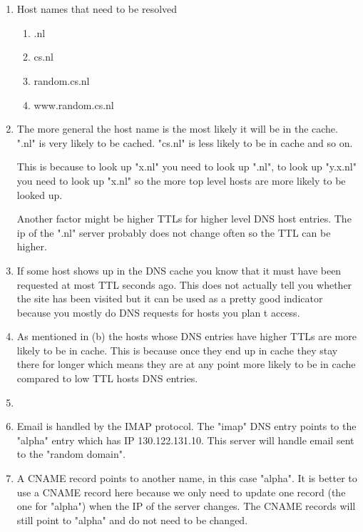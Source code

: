 \documentclass[12pt, a4paper]{article}
\begin{document}
\section{} %
\begin{enumerate}[a]
	\item %
	Host names that need to be resolved
	\begin{enumerate}
		\item .nl
		\item cs.nl
		\item random.cs.nl
		\item www.random.cs.nl
	\end{enumerate}

	\item %
	The more general the host name is the most likely it will be in the cache. ".nl" is very likely to be cached. "cs.nl" is less likely to be in cache and so on.

	This is because to look up "x.nl" you need to look up ".nl", to look up "y.x.nl" you need to look up "x.nl" so the more top level hosts are more likely to be looked up.

	Another factor might be higher TTLs for higher level DNS host entries. The ip of the ".nl" server probably does not change often so the TTL can be higher.

	\item %
	If some host shows up in the DNS cache you know that it must have been requested at most TTL seconds ago. This does not actually tell you whether the site has been visited but it can be used as a pretty good indicator because you mostly do DNS requests for hosts you plan t access.

	\item %
	As mentioned in (b) the hosts whose DNS entries have higher TTLs are more likely to be in cache. This is because once they end up in cache they stay there for longer which means they are at any point more likely to be in cache compared to low TTL hosts DNS entries.

	\item %
	\item %
	Email is handled by the IMAP protocol. The "imap" DNS entry points to the "alpha" entry which has IP 130.122.131.10. This server will handle email sent to the "random domain".

	\item %
	A CNAME record points to another name, in this case "alpha". It is better to use a CNAME record here because we only need to update one record (the one for "alpha") when the IP of the server changes. The CNAME records will still point to "alpha" and do not need to be changed.
\end{enumerate}
\end{document}
